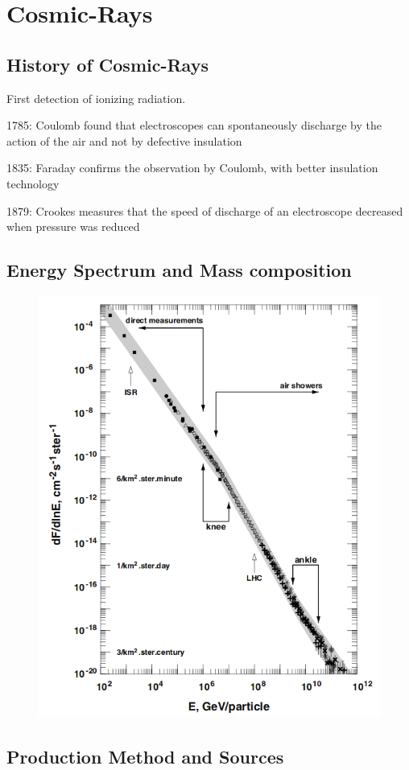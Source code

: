 \chapter{Cosmic-Rays}\label{Ch:Cosmic-rays}

\section{History of Cosmic-Rays}

First detection of ionizing radiation. 

1785: Coulomb found that 
electroscopes can spontaneously 
discharge by the action of the air 
and not by defective insulation

1835: Faraday confirms the 
observation by Coulomb, with 
better insulation technology

1879: Crookes measures that the 
speed of discharge of an 
electroscope decreased when 
pressure was reduced 

\section{Energy Spectrum and Mass composition}

\begin{figure}
\includegraphics[height=\textheight]{pix/CosmicRay_Spectrum.png}
\end{figure}

\section{Production Method and Sources}
